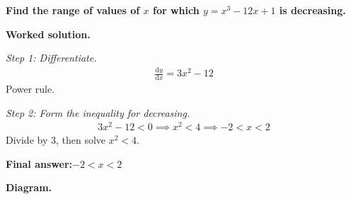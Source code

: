 \documentclass[11pt]{article}
\newcommand{\question}[1]{\par\medskip\noindent\textbf{#1}\par}
\begin{document}
\question{Find the range of values of \( x \) for which \( y = x^3 - 12x + 1 \) is decreasing.}

\textbf{Worked solution.}

\textit{Step 1: Differentiate.}
\[\begin{gathered}
\frac{\mathrm{d}y}{\mathrm{d}x} = 3x^2 - 12
\end{gathered}\]
Power rule.

\textit{Step 2: Form the inequality for decreasing.}
\[\begin{gathered}
3x^2 - 12 < 0 \implies x^2 < 4 \implies -2 < x < 2
\end{gathered}\]
Divide by 3, then solve \( x^2 < 4 \).

\begin{answerbox}
\textbf{Final answer:}\quad \(\displaystyle  -2 < x < 2 \)
\end{answerbox}
\textbf{Diagram.}
\end{document}
